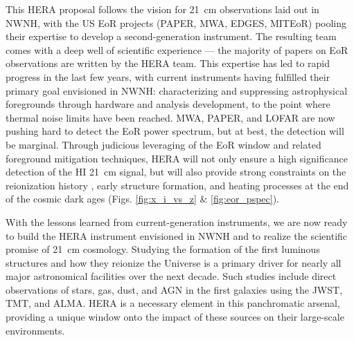 \documentclass[preprint]{aastex}
\def\HI{{H{\small I }}}
\begin{document}
This HERA proposal follows the vision for 21~cm observations laid out in NWNH, with the US EoR
projects (PAPER, MWA, EDGES, MITEoR) pooling their expertise to develop a second-generation
instrument.  The resulting team comes with a deep well of scientific experience --- the majority of papers on EoR observations are written by the HERA team.
This expertise has led to rapid progress in the last few years, with current instruments having fulfilled their primary goal envisioned in NWNH: characterizing and suppressing astrophysical foregrounds through hardware and analysis development, to the point where thermal noise limits have been reached.  MWA, PAPER, and LOFAR are now pushing hard to detect the EoR power spectrum, but at best, the detection will be marginal.  Through judicious leveraging of the EoR window and related foreground mitigation techniques, HERA will not only ensure a high significance detection of the \HI 21~cm signal, but will also provide strong constraints on the reionization history \citep{pober_et_al2014}, early structure formation, and heating processes at the end of the
cosmic dark ages (Figs. \ref{fig:x_i_vs_z} \& \ref{fig:eor_pspec}).

With the lessons learned from current-generation instruments, we are now ready to build the HERA
instrument envisioned in NWNH and to realize the scientific promise of 21~cm
cosmology. Studying the formation of the first luminous structures 
and how they reionize the Universe is a primary driver for 
nearly all major astronomical facilities over the next decade.
Such studies include direct  observations of stars, gas, dust, and AGN in the
first galaxies using the JWST, TMT, and ALMA. HERA is 
a necessary element in this panchromatic arsenal, 
providing a unique window onto the impact of these sources on 
their large-scale environments.


\clearpage
\setcounter{page}{1}
\thispagestyle{empty}
%
%

%

\end{document}
